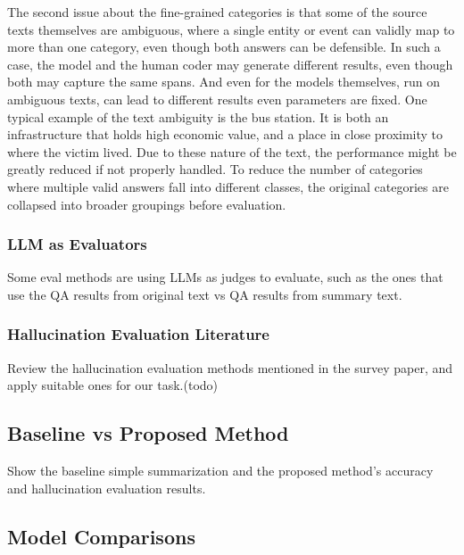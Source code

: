 \documentclass{article}
\begin{document}
The second issue about the fine-grained categories is that some of the source texts themselves are ambiguous, where a single entity or event can validly map to more than one category, even though both answers can be defensible. In such a case, the model and the human coder may generate different results, even though both may capture the same spans. And even for the models themselves, run on ambiguous texts, can lead to different results even parameters are fixed. One typical example of the text ambiguity is the bus station. It is both an infrastructure that holds high economic value, and a place in close proximity to where the victim lived. Due to these nature of the text, the performance might be greatly reduced if not properly handled. To reduce the number of categories where multiple valid answers fall into different classes, the original categories are collapsed into broader groupings before evaluation.

\subsubsection{LLM as Evaluators}\label{llm-as-evaluators}

Some eval methods are using LLMs as judges to evaluate, such as the ones
that use the QA results from original text vs QA results from summary
text.

\subsubsection{Hallucination Evaluation
Literature}\label{hallucination-evaluation-literature}

Review the hallucination evaluation methods mentioned in the survey
paper, and apply suitable ones for our task.(todo)


\subsection{Baseline vs Proposed
Method}\label{baseline-vs-proposed-method}

Show the baseline simple summarization and the proposed method's
accuracy and hallucination evaluation results.

\subsection{Model Comparisons}\label{model-comparisons}
\end{document}
